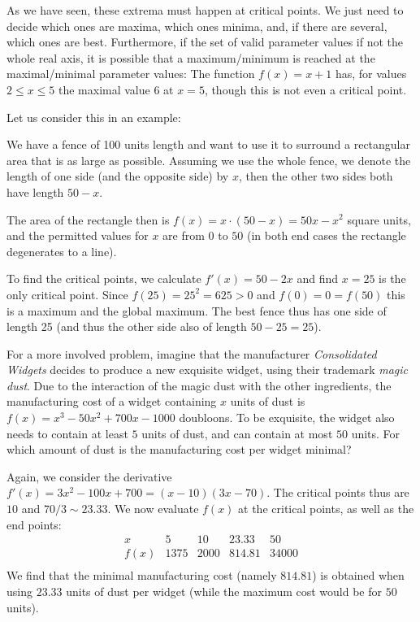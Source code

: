 As we have seen, these extrema must happen at critical points. We just need
to decide which ones are maxima, which ones minima, and, if there are
several, which ones are best. Furthermore, if the set of valid parameter
values if not the whole real axis, it is possible that a maximum/minimum is
reached at the maximal/minimal parameter values: The function $f(x)=x+1$ has,
for values $2\le x\le 5$ the maximal value $6$ at $x=5$, though this is not
even a critical point.
\medskip

Let us consider this in an example:

We have a fence of 100 units length and want to use it to surround a
rectangular area that is as large as possible. Assuming we use the whole
fence, we denote the length of one side (and the opposite side) by $x$, then
the other two sides
both have length $50-x$.

The area of the rectangle then is $f(x)=x\cdot(50-x)=50x-x^2$ square units,
and the permitted values for $x$ are from $0$ to $50$ (in both end cases the
rectangle degenerates to a line).
\smallskip

To find the critical points, we calculate $f'(x)=50-2x$ and find $x=25$ is
the only critical point. Since $f(25)=25^2=625>0$ and $f(0)=0=f(50)$ this is
a maximum and the global maximum. The best fence thus has one side of length
25 (and thus the other side also of length $50-25=25$).
\medskip

For a more involved problem, imagine that the manufacturer {\em Consolidated
Widgets} decides to produce a new exquisite widget, using their trademark
{\em magic dust}. Due to the interaction of the magic dust with the other
ingredients, the manufacturing cost of a widget containing $x$ units of dust
is $f(x)=x^3-50x^2+700x-1000$ doubloons. To be exquisite, the widget also needs
to contain at least $5$ units of dust, and can contain at most $50$ units.
For which amount of dust is the
manufacturing cost per widget minimal?

Again, we consider the derivative $f'(x)=3x^2-100x+700=(x-10)(3x-70)$. The
critical points thus are $10$ and $70/3\sim 23.33$. We now evaluate $f(x)$
at the critical points, as well as the end points:
\[
\begin{array}{c|r|r|r|r}
x&5&10&23.33&50\\
\hline
f(x)&1375&2000&814.81&34000\\
\end{array}
\]
We find that the minimal manufacturing cost (namely $814.81$) is obtained when using $23.33$
units of dust per widget (while the maximum cost would be for $50$ units).

